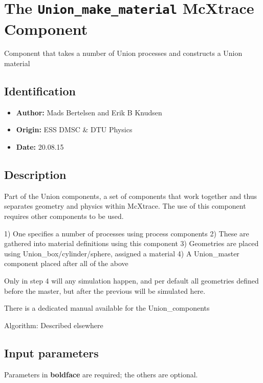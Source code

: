 \section{The \texttt{Union\_make\_material} McXtrace Component}
Component that takes a number of Union processes and constructs a Union material

\subsection*{Identification}
\begin{itemize}
  \item \textbf{Author:} Mads Bertelsen and Erik B Knudsen
  \item \textbf{Origin:} ESS DMSC \& DTU Physics
  \item \textbf{Date:} 20.08.15
\end{itemize}

\subsection*{Description}
Part of the Union components, a set of components that work together and thus separates geometry and physics within McXtrace. The use of this component requires other components to be used.

1) One specifies a number of processes using process components 2) These are gathered into material definitions using this component 3) Geometries are placed using Union\_box/cylinder/sphere, assigned a material 4) A Union\_master component placed after all of the above

Only in step 4 will any simulation happen, and per default all geometries defined before the master, but after the previous will be simulated here.

There is a dedicated manual available for the Union\_components

Algorithm: Described elsewhere

\subsection*{Input parameters}
Parameters in \textbf{boldface} are required; the others are optional.

